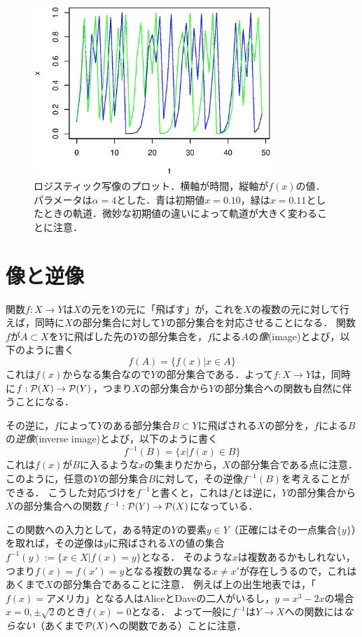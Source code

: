 \documentclass[dvipdfmx, 11pt,a4paper]{jsarticle}
\begin{document}
\begin{figure}[ht]
      \centering
      \includegraphics[width=9cm]{figs/logistic.eps}
      \caption{ロジスティック写像のプロット．横軸が時間，縦軸が$f(x)$の値．パラメータは$\alpha=4$とした．青は初期値$x=0.10$，緑は$x=0.11$としたときの軌道．微妙な初期値の違いによって軌道が大きく変わることに注意．}
      \label{fig:logistic}
\end{figure}

\section{像と逆像}

関数$f:X \to Y$は$X$の元を$Y$の元に「飛ばす」が，これを$X$の複数の元に対して行えば，同時に$X$の部分集合に対して$Y$の部分集合を対応させることになる．
関数$f$が$A \subset X$を$Y$に飛ばした先の$Y$の部分集合を，$f$による$A$の\emph{像}(image)とよび，以下のように書く
\[
 f(A) = \{f(x)|x \in A\} 
\]
これは$f(x)$からなる集合なので$Y$の部分集合である．よって$f:X \to Y$は，同時に$f:\mathcal{P}(X) \to \mathcal{P}(Y)$，つまり$X$の部分集合から$Y$の部分集合への関数も自然に伴うことになる．

その逆に，$f$によって$Y$のある部分集合$B \subset Y$に飛ばされる$X$の部分を，$f$による$B$の\emph{逆像}(inverse image)とよび，以下のように書く
\[
 f^{-1}(B) = \{x|f(x) \in B\} 
\]
これは$f(x)$が$B$に入るような$x$の集まりだから，$X$の部分集合である点に注意．
このように，任意の$Y$の部分集合$B$に対して，その逆像$f^{-1}(B)$を考えることができる．
こうした対応づけを$f^{-1}$と書くと，これは$f$とは逆に，$Y$の部分集合から$X$の部分集合への関数$f^{-1}:\mathcal{P}(Y) \to \mathcal{P}(X)$になっている．

この関数への入力として，ある特定の$Y$の要素$y \in Y$（正確にはその一点集合$\{y\}$）を取れば，その逆像は$y$に飛ばされる$X$の値の集合$f^{-1}(y) := \{ x \in X | f(x) = y\}$となる．
そのような$x$は複数あるかもしれない，つまり$f(x) = f(x') = y$となる複数の異なる$x \neq x'$が存在しうるので，これはあくまで$X$の部分集合であることに注意．
例えば上の出生地表では，「$f(x)=\text{アメリカ}$」となる人はAliceとDaveの二人がいるし，$y=x^3-2x$の場合$x=0, \pm \sqrt{2}$のとき$f(x)=0$となる．
よって一般に$f^{-1}$は$Y \to X$への関数には\emph{ならない}（あくまで$\mathcal{P}(X)$への関数である）ことに注意．
\end{document}

